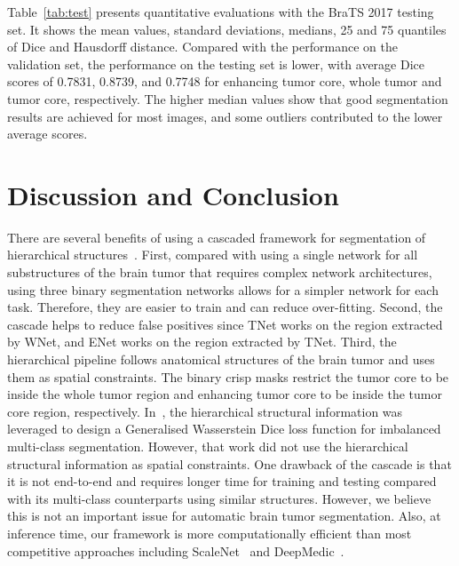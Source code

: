 \documentclass[a4paper,orivec,runningheads]{llncs}
\begin{document}
Table~\ref{tab:test} presents quantitative evaluations with the BraTS 2017 testing set. It shows the mean values, standard deviations, medians, 25 and 75 quantiles of Dice and Hausdorff distance. Compared with the performance on the validation set, the performance on the testing set is lower, with average Dice scores of 0.7831, 0.8739, and 0.7748 for enhancing tumor core, whole tumor and tumor core, respectively. The higher median values show that good segmentation results are achieved for most images, and some outliers contributed to the lower average scores. 



\section{Discussion and Conclusion}
There are several benefits of using a cascaded framework for segmentation of hierarchical structures~\cite{Christ2016}. First, compared with using a single network for all substructures of the brain tumor that requires complex network architectures, using three binary segmentation networks allows for a simpler network for each task. Therefore, they are easier to train and can reduce over-fitting. Second, the cascade helps to reduce false positives since TNet works on the region extracted by WNet, and ENet works on the region extracted by TNet. Third, the hierarchical pipeline follows anatomical structures of the brain tumor and uses them as spatial constraints. The binary crisp masks restrict the tumor core to be inside the whole tumor region and enhancing tumor core to be inside the tumor core region, respectively.
In~\cite{Fidon2017b}, the hierarchical structural information was leveraged to design a Generalised Wasserstein Dice loss function for imbalanced multi-class segmentation. However, that work did not use the hierarchical structural information as spatial constraints. One drawback of the cascade is that it is not end-to-end and requires longer time for training and testing compared with its multi-class counterparts using similar structures. However, we believe this is not an important issue for automatic brain tumor segmentation. Also, at inference time, our framework is more computationally efficient than most competitive approaches including ScaleNet~\cite{Fidon2017a} and  DeepMedic~\cite{Kamnitsas2017}. 
\end{document}

